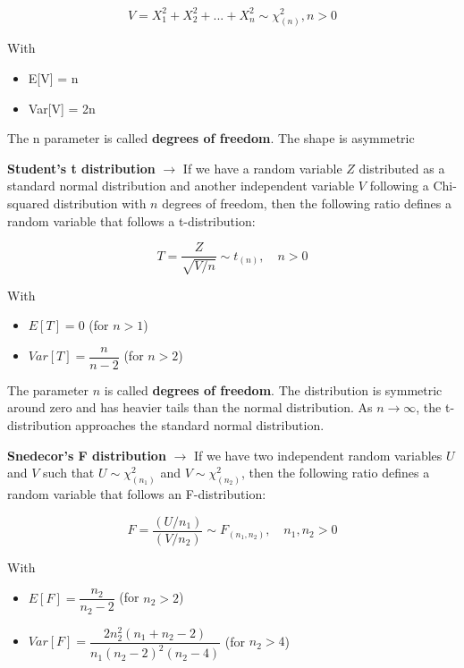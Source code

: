 \begin{equation}
    V=X_1^2+X_2^2+...+X_n^2 \sim\chi_{(n)}^2, n>0
\end{equation}

With
\begin{itemize}
    \item E[V] = n
    \item Var[V] = 2n
\end{itemize}

The n parameter is called \textbf{degrees of freedom}. The shape is asymmetric

\vspace{10pt}


\textbf{Student’s t distribution} $\rightarrow$  
If we have a random variable $Z$ distributed as a standard normal distribution and another independent variable $V$ following a Chi-squared distribution with $n$ degrees of freedom, then the following ratio defines a random variable that follows a t-distribution:

\begin{equation}
    T = \frac{Z}{\sqrt{V / n}} \sim t_{(n)}, \quad n > 0
\end{equation}

With
\begin{itemize}
    \item $E[T] = 0$ \quad (for $n > 1$)
    \item $Var[T] = \dfrac{n}{n - 2}$ \quad (for $n > 2$)
\end{itemize}

The parameter $n$ is called \textbf{degrees of freedom}.  
The distribution is symmetric around zero and has heavier tails than the normal distribution.  
As $n \to \infty$, the t-distribution approaches the standard normal distribution.

\vspace{10pt}


\textbf{Snedecor’s F distribution} $\rightarrow$  
If we have two independent random variables $U$ and $V$ such that  
$U \sim \chi^2_{(n_1)}$ and $V \sim \chi^2_{(n_2)}$,  
then the following ratio defines a random variable that follows an F-distribution:

\begin{equation}
    F = \frac{(U / n_1)}{(V / n_2)} \sim F_{(n_1, n_2)}, \quad n_1, n_2 > 0
\end{equation}

With
\begin{itemize}
    \item $E[F] = \dfrac{n_2}{n_2 - 2}$ \quad (for $n_2 > 2$)
    \item $Var[F] = \dfrac{2n_2^2 (n_1 + n_2 - 2)}{n_1 (n_2 - 2)^2 (n_2 - 4)}$ \quad (for $n_2 > 4$)
\end{itemize}

